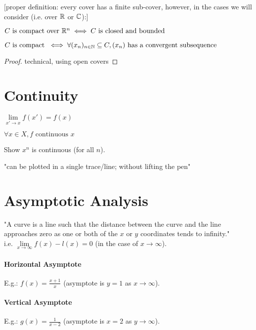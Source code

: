 [proper definition: every cover has a finite sub-cover, however, in the cases we will consider (i.e. over $\mathbb{R}$ or $\mathbb{C}$):]
\begin{definition}
	$C \text{ is compact over } \mathbb{R}^n \iff C \text{ is closed and bounded}$ 
\end{definition}
\begin{property}
	$C \text{ is compact } \iff \forall (x_n)_{n \in \mathbb{N}} \subseteq C, (x_n) \text{ has a convergent subsequence}$
\end{property}
\begin{proof}
	technical, using open covers
\end{proof}



\section{Continuity}
\begin{definition}[$f$ continuous at $x$]
	$\lim\limits_{x' \to x} f(x') = f(x)$
\end{definition}
\begin{definition}[$f$ continuous on $X$]
	$\forall x \in X, f \text{ continuous } x$
\end{definition}
\begin{question}
	Show $x^n$ is continuous (for all $n$).
\end{question}
"can be plotted in a single trace/line; without lifting the pen"



\section{Asymptotic Analysis}

\begin{definition}[Asymptote]
	"A curve is a line such that the distance between the curve and the line approaches zero as one or both of the $x$ or $y$ coordinates tends to infinity." \\
	i.e. $\lim\limits_{x \to \infty} f(x)-l(x) = 0$ (in the case of $x \to \infty$).
\end{definition}
\paragraph{Horizontal Asymptote}
E.g.: $f(x) = \frac{x+1}{x}$ (asymptote is $y=1$ as $x \to \infty$).
\paragraph{Vertical Asymptote}
E.g.: $g(x) = \frac{1}{x-2}$ (asymptote is $x=2$ as $y \to \infty$).
